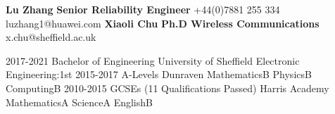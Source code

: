 \documentclass[9pt]{developercv} %
\begin{document}
\begin{minipage}[t]{0.40\textwidth}%

	\textbf{Lu Zhang} \hfill \textbf{Senior Reliability Engineer}\newline
	\hspace*{0.5cm}+44(0)7881 255 334\newline
	\hspace*{0.5cm}luzhang1@huawei.com\newline
	\textbf{Xiaoli Chu} \hfill \textbf{Ph.D Wireless Communications}\newline
	\hspace*{0.5cm}x.chu@sheffield.ac.uk\\ %
\end{minipage}
\hspace*{0.5cm}
\begin{minipage}[t]{0.57\textwidth}

	\halfentry
		{2017-2021}
		{Bachelor of Engineering}
		{University of Sheffield}
		{\hspace*{0.5cm}Electronic Engineering:\hfill1st}
	\halfentry
		{2015-2017}
		{A-Levels}
		{Dunraven}
		{
			\hspace*{0.5cm}Mathematics\hfill B\newline
			\hspace*{0.5cm}Physics\hfill B\newline
			\hspace*{0.5cm}Computing\hfill B%
		}
	\halfentry
		{2010-2015}
		{GCSEs (11 Qualifications Passed)}
		{Harris Academy}
		{
			\hspace*{0.5cm}Mathematics\hfill A\newline
			\hspace*{0.5cm}Science\hfill A\newline
			\hspace*{0.5cm}English\hfill B%
		}
\end{minipage}%
\end{document}

